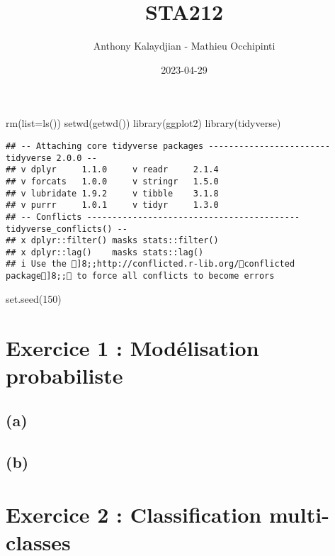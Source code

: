 \documentclass[
]{article}
\title{STA212}
\author{Anthony Kalaydjian - Mathieu Occhipinti}
\date{2023-04-29}
\newenvironment{Shaded}{\begin{snugshade}}{\end{snugshade}}
\newcommand{\AttributeTok}[1]{\textcolor[rgb]{0.77,0.63,0.00}{#1}}
\newcommand{\DecValTok}[1]{\textcolor[rgb]{0.00,0.00,0.81}{#1}}
\newcommand{\FunctionTok}[1]{\textcolor[rgb]{0.00,0.00,0.00}{#1}}
\newcommand{\NormalTok}[1]{#1}
\begin{document}
\maketitle

\begin{Shaded}
\begin{Highlighting}[]
\FunctionTok{rm}\NormalTok{(}\AttributeTok{list=}\FunctionTok{ls}\NormalTok{())}
\FunctionTok{setwd}\NormalTok{(}\FunctionTok{getwd}\NormalTok{())}
\FunctionTok{library}\NormalTok{(ggplot2)}
\FunctionTok{library}\NormalTok{(tidyverse)}
\end{Highlighting}
\end{Shaded}

\begin{verbatim}
## -- Attaching core tidyverse packages ------------------------ tidyverse 2.0.0 --
## v dplyr     1.1.0     v readr     2.1.4
## v forcats   1.0.0     v stringr   1.5.0
## v lubridate 1.9.2     v tibble    3.1.8
## v purrr     1.0.1     v tidyr     1.3.0
## -- Conflicts ------------------------------------------ tidyverse_conflicts() --
## x dplyr::filter() masks stats::filter()
## x dplyr::lag()    masks stats::lag()
## i Use the ]8;;http://conflicted.r-lib.org/conflicted package]8;; to force all conflicts to become errors
\end{verbatim}

\begin{Shaded}
\begin{Highlighting}[]
\FunctionTok{set.seed}\NormalTok{(}\DecValTok{150}\NormalTok{)}
\end{Highlighting}
\end{Shaded}

\hypertarget{exercice-1-moduxe9lisation-probabiliste}{%
\section{Exercice 1 : Modélisation
probabiliste}\label{exercice-1-moduxe9lisation-probabiliste}}

\hypertarget{a}{%
\subsection{(a)}\label{a}}

\hypertarget{b}{%
\subsection{(b)}\label{b}}

\hypertarget{exercice-2-classification-multi-classes}{%
\section{Exercice 2 : Classification
multi-classes}\label{exercice-2-classification-multi-classes}}
\end{document}
